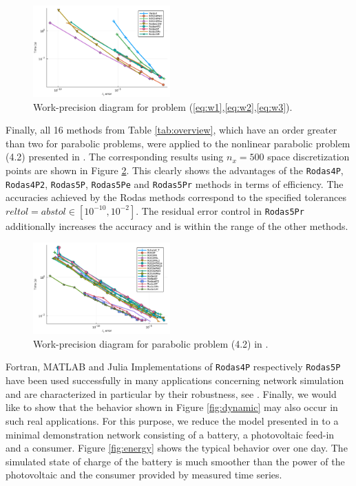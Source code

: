 \documentclass{juliacon}
\begin{document}
\begin{figure}
 \centering
 \includegraphics[width=0.47\textwidth]{Abb4.pdf}
 \caption{Work-precision diagram for problem (\ref{eq:w1},\ref{eq:w2},\ref{eq:w3}).}\label{fig:benchW}
\end{figure}

Finally, all 16 methods from Table \ref{tab:overview}, which have an order greater than two for parabolic problems, were applied to the  
nonlinear parabolic problem (4.2) presented in \cite{rodas5p}. The corresponding results using $n_x=500$ space discretization points are shown in Figure \ref{fig:benchpara}. 
This clearly shows the advantages of the \verb|Rodas4P|, \verb|Rodas4P2|, \verb|Rodas5P|, \verb|Rodas5Pe| and \verb|Rodas5Pr| methods in terms of efficiency. 
The accuracies achieved by the Rodas methods correspond to the specified tolerances $reltol = abstol \in [10^{-10},10^{-2}]$. 
The residual error control in \verb|Rodas5Pr| additionally increases the accuracy and is within the range of the other methods.

\begin{figure}
 \centering
 \includegraphics[width=0.47\textwidth]{Abb5.pdf}
 \caption{Work-precision diagram for parabolic problem (4.2) in \cite{rodas5}.}\label{fig:benchpara}
\end{figure}

Fortran, MATLAB and Julia Implementations of \verb|Rodas4P| respectively \verb|Rodas5P| have been used successfully in many applications concerning network simulation and are characterized in particular 
by their robustness, see \cite{jaxsteinebach,rentropsteinebach,ecmi,dreistadtsteinebach}.
Finally, we would like to show that the behavior shown in Figure \ref{fig:dynamic} may also occur in such real applications. 
For this purpose, we reduce the model presented in \cite{flexhyx} to a minimal demonstration network consisting of a battery, a photovoltaic feed-in and a consumer.
Figure \ref{fig:energy} shows the typical behavior over one day. The simulated state of charge of the battery is much smoother than the power of the 
photovoltaic and the consumer provided by measured time series. 
\end{document}
